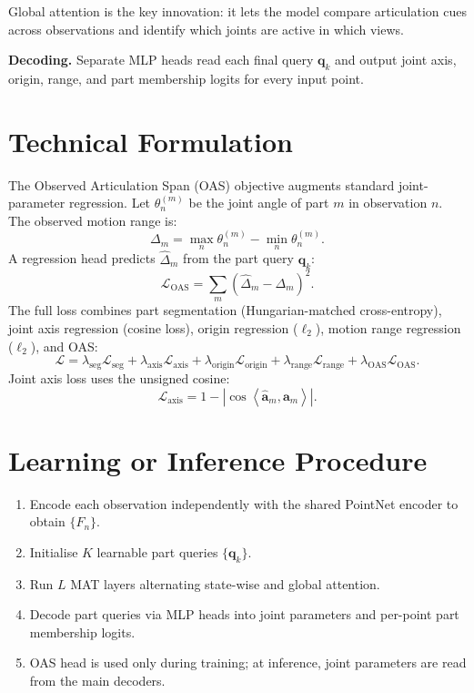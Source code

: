 \documentclass[10pt,twocolumn]{article}
\begin{document}
Global attention is the key innovation: it lets the model compare
articulation cues across observations and identify which joints are active
in which views.

\textbf{Decoding.} Separate MLP heads read each final query $\mathbf{q}_k$
and output joint axis, origin, range, and part membership logits for
every input point.

\section{Technical Formulation}

The Observed Articulation Span (OAS) objective augments standard joint-
parameter regression. Let $\theta_n^{(m)}$ be the joint angle of part $m$
in observation $n$. The observed motion range is:
\[
\Delta_m = \max_n \theta_n^{(m)} - \min_n \theta_n^{(m)}.
\]
A regression head predicts $\hat{\Delta}_m$ from the part query $\mathbf{q}_k$:
\[
\mathcal{L}_{\text{OAS}} = \sum_m \left(\hat{\Delta}_m - \Delta_m\right)^2.
\]
The full loss combines part segmentation (Hungarian-matched cross-entropy),
joint axis regression (cosine loss), origin regression ($\ell_2$), motion
range regression ($\ell_2$), and OAS:
\[
\mathcal{L} = \lambda_{\text{seg}}\mathcal{L}_{\text{seg}}
           + \lambda_{\text{axis}}\mathcal{L}_{\text{axis}}
           + \lambda_{\text{origin}}\mathcal{L}_{\text{origin}}
           + \lambda_{\text{range}}\mathcal{L}_{\text{range}}
           + \lambda_{\text{OAS}}\mathcal{L}_{\text{OAS}}.
\]
Joint axis loss uses the unsigned cosine:
\[
\mathcal{L}_{\text{axis}} = 1 - \left|\cos\!\left\langle \hat{\mathbf{a}}_m,\mathbf{a}_m\right\rangle\right|.
\]

\section{Learning or Inference Procedure}

\begin{enumerate}[itemsep=2pt,parsep=0pt]
  \item Encode each observation independently with the shared PointNet
    encoder to obtain $\{F_n\}$.
  \item Initialise $K$ learnable part queries $\{\mathbf{q}_k\}$.
  \item Run $L$ MAT layers alternating state-wise and global attention.
  \item Decode part queries via MLP heads into joint parameters and
    per-point part membership logits.
  \item OAS head is used only during training; at inference, joint
    parameters are read from the main decoders.
\end{enumerate}
\end{document}

